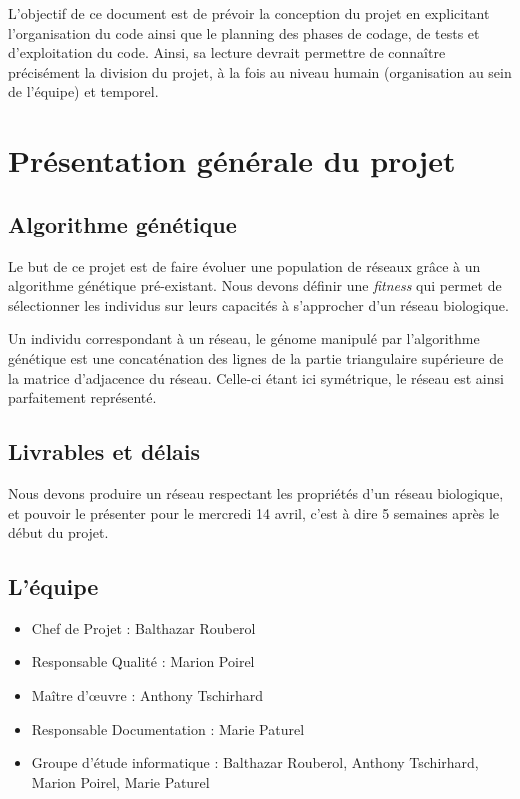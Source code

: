 


\maketitle

L'objectif de ce document est de prévoir la conception du projet en explicitant l'organisation du code ainsi que le planning des phases de codage, de tests et d'exploitation du code. Ainsi, sa lecture devrait permettre de connaître précisément la division du projet, à la fois au niveau humain (organisation au sein de l'équipe) et temporel.

\section{Présentation générale du projet}

\subsection{Algorithme génétique}
Le but de ce projet est de faire évoluer une population de réseaux grâce à un algorithme génétique pré-existant. Nous devons définir une \textit{fitness} qui permet de sélectionner les individus sur leurs capacités à s'approcher d'un réseau biologique.

Un individu correspondant à un réseau, le génome manipulé par l'algorithme génétique est une concaténation des lignes de la partie triangulaire supérieure de la matrice d'adjacence du réseau. Celle-ci étant ici symétrique, le réseau est ainsi parfaitement représenté.

\subsection{Livrables et délais}
Nous devons produire un réseau respectant les propriétés d'un réseau biologique, et pouvoir le présenter pour le mercredi 14 avril, c'est à dire 5 semaines après le début du projet.

\subsection{L'équipe}
\begin{itemize}
\item Chef de Projet : Balthazar Rouberol
\item Responsable Qualité : Marion Poirel
\item Ma\^itre d'œuvre : Anthony Tschirhard
\item Responsable Documentation : Marie Paturel
\item Groupe d'étude informatique : Balthazar Rouberol, Anthony Tschirhard, Marion Poirel, Marie Paturel
\end{itemize}



